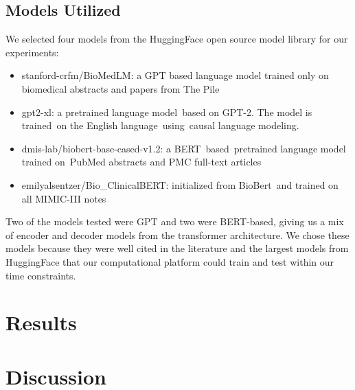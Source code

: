 \documentclass[manuscript,screen,review,nonacm]{acmart}
\begin{document}
\subsection{Models Utilized}
We selected four models from the HuggingFace open source model library for our experiments:
\begin{itemize}
  \item stanford-crfm/BioMedLM: a GPT based language model trained only on biomedical abstracts and papers from The Pile
  \item gpt2-xl: a pretrained language model based on GPT-2. The model is trained on the English language using causal language modeling.
  \item dmis-lab/biobert-base-cased-v1.2: a BERT based pretrained language model trained on PubMed abstracts and PMC full-text articles
  \item emilyalsentzer/Bio\_ClinicalBERT: initialized from BioBert and trained on all MIMIC-III notes
\end{itemize}
Two of the models tested were GPT and two were BERT-based, giving us a mix of encoder and decoder models from the transformer architecture. We chose these models because they were well cited in the literature and the largest models from HuggingFace that our computational platform could train and test within our time constraints. 


\section{Results}

\section{Discussion}




\end{document}
